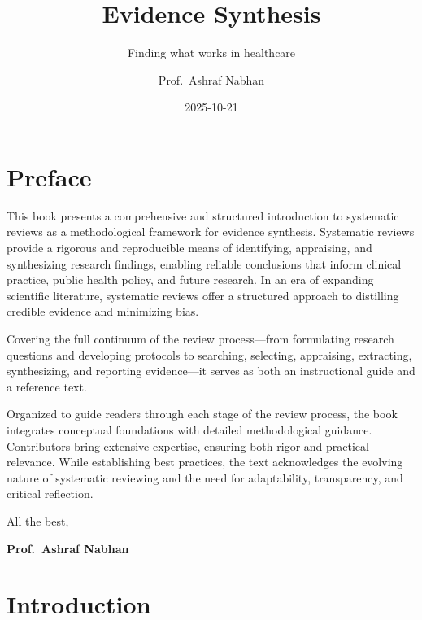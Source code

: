 \documentclass[
  11pt,
  a4paper,
  DIV=11,
  numbers=noendperiod]{scrreprt}
\title{Evidence Synthesis}
\subtitle{Finding what works in healthcare}
\author{Prof.~Ashraf Nabhan}
\date{2025-10-21}
\renewcommand*\contentsname{Table of contents}
\newcommand\contentsname{Table of contents}
\begin{document}
\maketitle

\renewcommand*\contentsname{On this page}
{
\hypersetup{linkcolor=}
\setcounter{tocdepth}{2}
\tableofcontents
}


\chapter*{Preface}\label{preface}


This book presents a comprehensive and structured introduction to
systematic reviews as a methodological framework for evidence synthesis.
Systematic reviews provide a rigorous and reproducible means of
identifying, appraising, and synthesizing research findings, enabling
reliable conclusions that inform clinical practice, public health
policy, and future research. In an era of expanding scientific
literature, systematic reviews offer a structured approach to distilling
credible evidence and minimizing bias.

Covering the full continuum of the review process---from formulating
research questions and developing protocols to searching, selecting,
appraising, extracting, synthesizing, and reporting evidence---it serves
as both an instructional guide and a reference text.

Organized to guide readers through each stage of the review process, the
book integrates conceptual foundations with detailed methodological
guidance. Contributors bring extensive expertise, ensuring both rigor
and practical relevance. While establishing best practices, the text
acknowledges the evolving nature of systematic reviewing and the need
for adaptability, transparency, and critical reflection.

All the best,

\textbf{Prof.~Ashraf Nabhan}


\chapter*{Introduction}\label{introduction}

\end{document}
